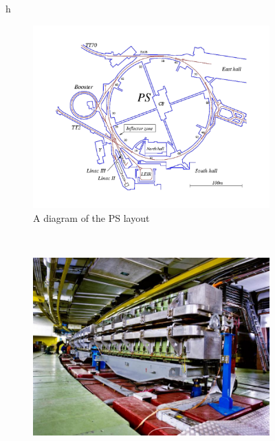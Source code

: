 \begin{figure}{h}
    \centering
    \begin{subfigure}[h]{0.45\textwidth}
        \includegraphics[width=\textwidth]{Figures/LHC_Diagrams/LHC__PS__pscomplex.pdf}
        \caption{A diagram of the PS layout \cite{LHC:LHC_ps_layout_image}}\label{fig:ps_layout}
      \end{subfigure}
      ~ %
    \begin{subfigure}[h]{0.45\textwidth}
        \includegraphics[width=\textwidth]{Figures/LHC_Diagrams/LHC__PS__Dipoles_accelerators-ps.jpg}

\end{subfigure}
\end{figure}
